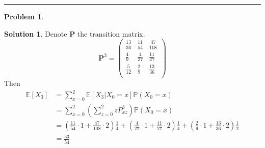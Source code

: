 \documentclass[a4paper, 10pt]{article}
\theoremstyle{definition}
\newtheorem{problem}{Problem}
\theoremstyle{hSol}
\newtheorem*{solution}{Solution}
\begin{document}
\noindent\rule{16cm}{0.4pt}
\begin{problem} 
\end{problem}
\begin{solution} Denote $\bm{P}$ the transition matrix.
\begin{equation}
  \bm{P}^3 = \left(
  \begin{array}{ccc}
   \frac{13}{36} & \frac{11}{54} & \frac{47}{108} \\[5pt]
   \frac{4}{9} & \frac{4}{27} & \frac{11}{27} \\[5pt]
   \frac{5}{12} & \frac{2}{9} & \frac{13}{36} \\[5pt]
  \end{array}
\right)
\end{equation}
Then 
\begin{equation}
  \begin{split}
    \mathbb{E}\left[X_3\right] &= \sum_{x=0}^2 \mathbb{E}\left[X_3|X_0=x\right]\mathbb{P}\left(X_0=x\right)\\
    &= \sum_{x=0}^2\left(\sum_{z=0}^2 zP^3_{xz}\right) \mathbb{P}\left(X_0=x\right)\\
    &= \left(\frac{11}{54}\cdot1 +\frac{47}{108}\cdot2\right)\frac{1}{4} + \left(\frac{4}{27}\cdot1 +\frac{11}{27}\cdot2\right)\frac{1}{4} + \left(\frac{2}{9}\cdot1 +\frac{13}{36}\cdot2\right)\frac{1}{2}\\
    & =\frac{53}{54}
  \end{split}
\end{equation}
\end{solution}
\end{document}

